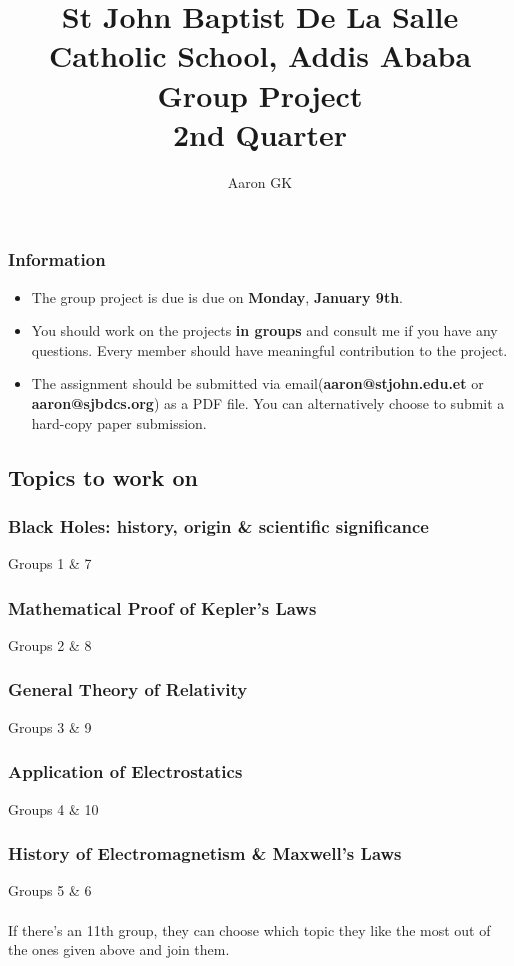 \documentclass[9pt,addpoints]{exam}
\author{Aaron GK}
\begin{document}
	\title{St John Baptist De La Salle Catholic School, Addis Ababa\\
		\large Group Project \\
		2nd Quarter}
	\maketitle
	\begin{center}
		\subsubsection*{Information}
		\begin{itemize}
			\item The group project is due is due on \textbf{Monday}, \textbf{January 9th}.
			\item You should work on the projects \textbf{in groups} and consult me if you have any questions. Every member should have meaningful contribution to the project.
			\item The assignment should be submitted via email(\textbf{aaron@stjohn.edu.et} or \textbf{aaron@sjbdcs.org}) as a PDF file. You can alternatively choose to submit a hard-copy paper submission.
		\end{itemize}
	\end{center}
	\begin{center}
		\subsection*{Topics to work on}
	\end{center}
 		\subsubsection*{Black Holes: history, origin \& scientific significance} 
 		Groups 1 \& 7
		\subsubsection*{Mathematical Proof of Kepler's Laws}
		Groups 2 \& 8
		\subsubsection*{General Theory of Relativity}
		Groups 3 \& 9
		\subsubsection*{Application of Electrostatics}
		Groups 4 \& 10
		\subsubsection*{History of Electromagnetism \& Maxwell's Laws} 
		Groups 5 \& 6 \\ \\ 
		
		If there's an 11th group, they can choose which topic they like the most out of the ones given above and join them.
\end{document}
